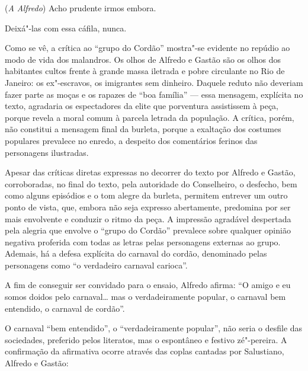 \begin{hedraquote} 
 (\textit{A Alfredo}) Acho prudente irmos embora.

 Deixá"-las com essa cáfila, nunca.
\end{hedraquote} 

Como se vê, a crítica ao “grupo do Cordão” mostra"-se evidente no repúdio
ao modo de vida dos malandros. Os olhos de Alfredo e Gastão são os
olhos dos habitantes cultos frente à grande massa iletrada e pobre
circulante no Rio de Janeiro: os ex"-escravos, os imigrantes sem
dinheiro. Daquele reduto não deveriam fazer parte as moças e os rapazes
de “boa família” --- essa mensagem, explícita no texto, agradaria os
espectadores da elite que porventura assistissem à peça, porque revela
a moral comum à parcela letrada da população. A crítica, porém, não
constitui a mensagem final da burleta, porque a exaltação dos costumes
populares prevalece no enredo, a despeito dos comentários ferinos das
personagens ilustradas.

Apesar das críticas diretas expressas no decorrer do texto por
Alfredo e Gastão, corroboradas, no final do texto, pela autoridade do
Conselheiro, o desfecho, bem como alguns episódios e o tom alegre da
burleta, permitem entrever um outro ponto de vista, que, embora não
seja expresso abertamente, predomina por ser mais envolvente e conduzir
o ritmo da peça. A impressão agradável despertada pela alegria que
envolve o “grupo do Cordão” prevalece sobre qualquer opinião negativa
proferida com todas as letras pelas personagens externas ao grupo.
Ademais, há a defesa explícita do carnaval do cordão, denominado pelas
personagens como “o verdadeiro carnaval carioca”.

A fim de conseguir ser convidado para o ensaio, Alfredo afirma:
``O amigo e eu somos doidos pelo carnaval\ldots{} mas o verdadeiramente
popular, o carnaval bem entendido, o carnaval de cordão''.

O carnaval “bem entendido”, o “verdadeiramente popular”, não seria o
desfile das sociedades, preferido pelos literatos, mas o espontâneo e
festivo zé"-pereira. A confirmação da afirmativa ocorre através das
coplas cantadas por Salustiano, Alfredo e Gastão:

